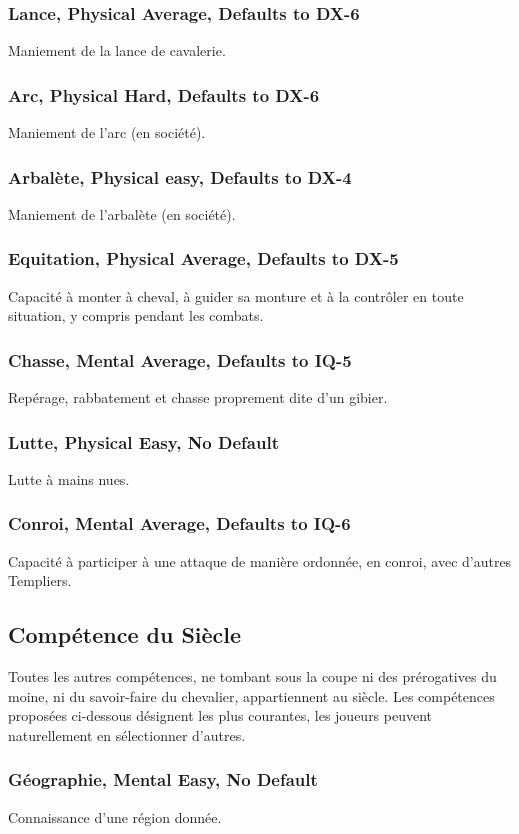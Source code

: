     \subsubsection*{Lance, Physical Average, Defaults to DX-6}
    Maniement de la lance de cavalerie.
    \subsubsection*{Arc, Physical Hard, Defaults to DX-6}
    Maniement de l'arc (en société).
    \subsubsection*{Arbalète, Physical easy, Defaults to DX-4}
    Maniement de l'arbalète (en société).
    \subsubsection*{Equitation, Physical Average, Defaults to DX-5}
    Capacité à monter à cheval, à guider sa monture et à la contrôler en toute
    situation, y compris pendant les combats.
    \subsubsection*{Chasse, Mental Average, Defaults to IQ-5}
    Repérage, rabbatement et chasse proprement dite d'un gibier.
    \subsubsection*{Lutte, Physical Easy, No Default}
    Lutte à mains nues.
    \subsubsection*{Conroi, Mental Average, Defaults to IQ-6}
    Capacité à participer à une attaque de manière ordonnée, en conroi, avec
    d'autres Templiers.

    \subsection{Compétence du Siècle}\label{subsec:comp-siecle}
    Toutes les autres compétences, ne tombant sous la coupe ni des prérogatives
    du moine, ni du savoir-faire du chevalier, appartiennent au siècle. Les
    compétences proposées ci-dessous désignent les plus courantes, les joueurs
    peuvent naturellement en sélectionner d'autres.
    \subsubsection*{Géographie, Mental Easy, No Default}
    Connaissance d'une région donnée.
